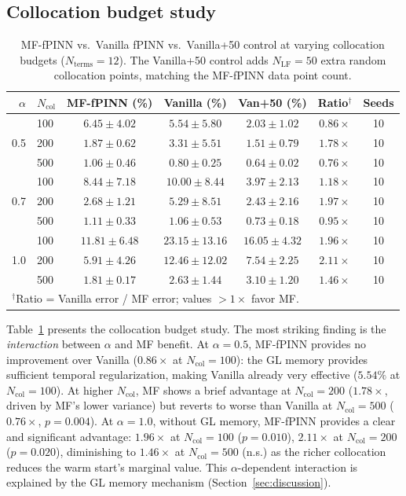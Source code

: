 \documentclass[preprint,12pt]{elsarticle}
\newcommand{\Ncol}{N_{\mathrm{col}}}
\newcommand{\NLF}{N_{\mathrm{LF}}}
\begin{document}
\subsection{Collocation budget study}
\label{sec:ncol}

\begin{table}[t]
\centering
\caption{MF-fPINN vs.\ Vanilla fPINN vs.\ Vanilla+50 control at varying collocation budgets ($N_{\mathrm{terms}} = 12$). The Vanilla+50 control adds $\NLF = 50$ extra random collocation points, matching the MF-fPINN data point count.}
\label{tab:ncol}
\begin{tabular}{rlccccc}
\toprule
$\alpha$ & $\Ncol$ & MF-fPINN (\%) & Vanilla (\%) & Van+50 (\%) & Ratio$^\dagger$ & Seeds \\
\midrule
\multirow{3}{*}{0.5}
 & 100 & $6.45 \pm 4.02$ & $5.54 \pm 5.80$ & $2.03 \pm 1.02$ & $0.86\times$ & 10 \\
 & 200 & $1.87 \pm 0.62$ & $3.31 \pm 5.51$ & $1.51 \pm 0.79$ & $1.78\times$ & 10 \\
 & 500 & $1.06 \pm 0.46$ & $0.80 \pm 0.25$ & $0.64 \pm 0.02$ & $0.76\times$ & 10 \\
\midrule
\multirow{3}{*}{0.7}
 & 100 & $8.44 \pm 7.18$ & $10.00 \pm 8.44$ & $3.97 \pm 2.13$ & $1.18\times$ & 10 \\
 & 200 & $2.68 \pm 1.21$ & $5.29 \pm 8.51$ & $2.43 \pm 2.16$ & $1.97\times$ & 10 \\
 & 500 & $1.11 \pm 0.33$ & $1.06 \pm 0.53$ & $0.73 \pm 0.18$ & $0.95\times$ & 10 \\
\midrule
\multirow{3}{*}{1.0}
 & 100 & $11.81 \pm 6.48$ & $23.15 \pm 13.16$ & $16.05 \pm 4.32$ & $\mathbf{1.96\times}$ & 10 \\
 & 200 & $5.91 \pm 4.26$ & $12.46 \pm 12.02$ & $7.54 \pm 2.25$ & $\mathbf{2.11\times}$ & 10 \\
 & 500 & $1.81 \pm 0.17$ & $2.63 \pm 1.44$ & $3.10 \pm 1.20$ & $1.46\times$ & 10 \\
\bottomrule
\multicolumn{7}{l}{\small $^\dagger$Ratio = Vanilla error / MF error; values $>1\times$ favor MF.} \\

\end{tabular}
\end{table}

Table~\ref{tab:ncol} presents the collocation budget study. The most striking finding is the \emph{interaction} between $\alpha$ and MF benefit. At $\alpha = 0.5$, MF-fPINN provides no improvement over Vanilla ($0.86\times$ at $\Ncol = 100$): the GL memory provides sufficient temporal regularization, making Vanilla already very effective ($5.54\%$ at $\Ncol = 100$). At higher $\Ncol$, MF shows a brief advantage at $\Ncol = 200$ ($1.78\times$, driven by MF's lower variance) but reverts to worse than Vanilla at $\Ncol = 500$ ($0.76\times$, $p = 0.004$). At $\alpha = 1.0$, without GL memory, MF-fPINN provides a clear and significant advantage: $\mathbf{1.96\times}$ at $\Ncol = 100$ ($p = 0.010$), $\mathbf{2.11\times}$ at $\Ncol = 200$ ($p = 0.020$), diminishing to $1.46\times$ at $\Ncol = 500$ (n.s.) as the richer collocation reduces the warm start's marginal value. This $\alpha$-dependent interaction is explained by the GL memory mechanism (Section~\ref{sec:discussion}).
\end{document}
